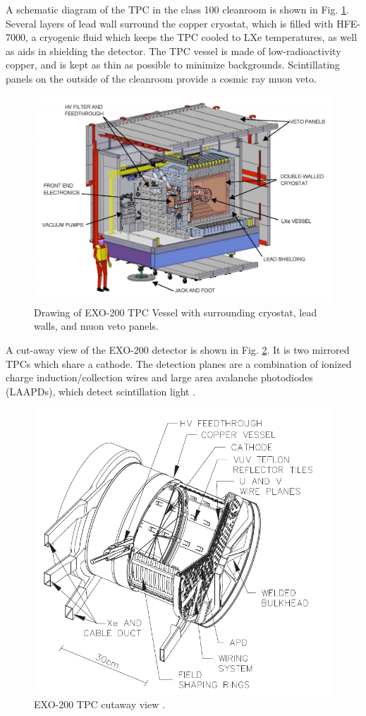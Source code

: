 A schematic diagram of the TPC in the class 100 cleanroom is shown in Fig. \ref{fig:cleanroom}.  Several layers of lead wall surround the copper cryostat, which is filled with HFE-7000, a cryogenic fluid which keeps the TPC cooled to LXe temperatures, as well as aids in shielding the detector.  The TPC vessel is made of low-radioactivity copper, and is kept as thin as possible to minimize backgrounds.  Scintillating panels on the outside of the cleanroom provide a cosmic ray muon veto.

\begin{figure} %
	\centering
	\includegraphics[width=.9\textwidth]{figures/cleanroom.png}
	\caption{Drawing of EXO-200 TPC Vessel with surrounding cryostat, lead walls, and muon veto panels.}
\label{fig:cleanroom}
\end{figure}

A cut-away view of the EXO-200 detector is shown in Fig. \ref{fig:tpc}.  It is two mirrored TPCs which share a cathode.  The detection planes are a combination of ionized charge induction/collection wires and large area avalanche photodiodes (LAAPDs), which detect scintillation light \cite{APDs}.

\begin{figure} %
	\centering
	\includegraphics[width=.9\textwidth]{figures/TPC.png}
	\caption{EXO-200 TPC cutaway view \cite{EXO200TwoNuLong}.}
\label{fig:tpc}
\end{figure}

